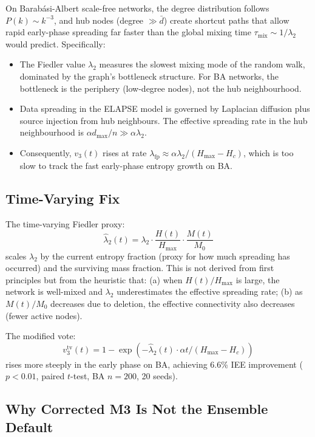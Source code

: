 \documentclass[review,12pt]{elsarticle}
\newcommand{\Hc}{H_c}
\newcommand{\Hmax}{H_{\max}}
\newcommand{\lambdat}{\lambda_2}
\begin{document}
On Barab\'{a}si-Albert scale-free networks, the degree distribution
follows $P(k) \sim k^{-3}$, and hub nodes (degree $\gg \bar{d}$) create
shortcut paths that allow rapid early-phase spreading far faster than the
global mixing time $\tau_{\mathrm{mix}} \sim 1/\lambdat$ would predict.
Specifically:
\begin{itemize}
  \item The Fiedler value $\lambdat$ measures the slowest mixing mode
        of the random walk, dominated by the graph's bottleneck structure.
        For BA networks, the bottleneck is the periphery (low-degree nodes),
        not the hub neighbourhood.
  \item Data spreading in the ELAPSE model is governed by Laplacian diffusion
        plus source injection from hub neighbours.  The effective spreading
        rate in the hub neighbourhood is $\alpha d_{\max}/n \gg \alpha\lambdat$.
  \item Consequently, $v_3(t)$ rises at rate $\lambda_{\mathrm{fp}} \approx \alpha\lambdat/(\Hmax - \Hc)$,
        which is too slow to track the fast early-phase entropy growth on BA.
\end{itemize}

\subsection{Time-Varying Fix}

The time-varying Fiedler proxy:
\[
  \hat{\lambda}_2(t) = \lambdat \cdot \frac{H(t)}{\Hmax} \cdot \frac{M(t)}{M_0}
\]
scales $\lambdat$ by the current entropy fraction (proxy for how much
spreading has occurred) and the surviving mass fraction.  This is not
derived from first principles but from the heuristic that:
(a) when $H(t)/\Hmax$ is large, the network is well-mixed and $\lambdat$
underestimates the effective spreading rate;
(b) as $M(t)/M_0$ decreases due to deletion, the effective connectivity
also decreases (fewer active nodes).

The modified vote:
\[
  v_3^{\mathrm{tv}}(t) = 1 - \exp\!\left(-\hat{\lambda}_2(t) \cdot \alpha t / (\Hmax - \Hc)\right)
\]
rises more steeply in the early phase on BA, achieving 6.6\% IEE
improvement ($p < 0.01$, paired $t$-test, BA $n=200$, 20 seeds).

\subsection{Why Corrected M3 Is Not the Ensemble Default}
\end{document}
